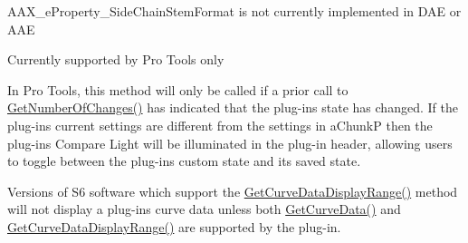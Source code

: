 \begin{DoxyRefList}
\label{a00879__compatibility_notes000064}%
%
 AAX\+\_\+e\+Property\+\_\+\+Side\+Chain\+Stem\+Format is not currently implemented in DAE or AAE  
\item[Member \mbox{\hyperlink{a00737_a13e384f22825afd3db6d68395b79ce0daf48412738dcfcc56046718d9e5a034d7}{AAX\+\_\+e\+Property\+\_\+\+Uses\+Client\+GUI}} ]\label{a00879__compatibility_notes000067}%
%
 Currently supported by Pro Tools only 
\item[Member \mbox{\hyperlink{a02068_a1e86f849e970c9998313fc7d451ccf85}{AAX\+\_\+\+IACFEffect\+Parameters\+::Compare\+Active\+Chunk}} (const \mbox{\hyperlink{a01784}{AAX\+\_\+\+SPlug\+In\+Chunk}} $\ast$i\+ChunkP, AAX\+\_\+\+CBoolean $\ast$o\+Is\+Equal) const =0]\label{a00879__compatibility_notes000049}%
%
 In Pro Tools, this method will only be called if a prior call to \mbox{\hyperlink{a00892_ga17b96da201d9a242d3662e87525a7227}{Get\+Number\+Of\+Changes()}} has indicated that the plug-\/in\textquotesingle{}s state has changed. If the plug-\/in\textquotesingle{}s current settings are different from the settings in {\ttfamily a\+ChunkP} then the plug-\/in\textquotesingle{}s Compare Light will be illuminated in the plug-\/in header, allowing users to toggle between the plug-\/in\textquotesingle{}s custom state and its saved state. 
\item[Member \mbox{\hyperlink{a00901_gaa85bda4027342eb644a9c92a17da6d49}{AAX\+\_\+\+IACFEffect\+Parameters\+::Get\+Curve\+Data}} (AAX\+\_\+\+CType\+ID i\+Curve\+Type, const float $\ast$i\+Values, uint32\+\_\+t i\+Num\+Values, float $\ast$o\+Values) const =0]\label{a00879__compatibility_notes000050}%
%
 Versions of S6 software which support the \mbox{\hyperlink{a00901_ga38d1ac0c15a7052904077ef0e2527e0d}{Get\+Curve\+Data\+Display\+Range()}} method will not display a plug-\/in\textquotesingle{}s curve data unless both \mbox{\hyperlink{a00901_gaa85bda4027342eb644a9c92a17da6d49}{Get\+Curve\+Data()}} and \mbox{\hyperlink{a00901_ga38d1ac0c15a7052904077ef0e2527e0d}{Get\+Curve\+Data\+Display\+Range()}} are supported by the plug-\/in. 
\item[Member \mbox{\hyperlink{a02068_a5d556ae1fa4617a6439ef347139d70eb}{AAX\+\_\+\+IACFEffect\+Parameters\+::Get\+Parameter\+Name\+Of\+Length}} (AAX\+\_\+\+CParam\+ID i\+Parameter\+ID, \mbox{\hyperlink{a02332}{AAX\+\_\+\+IString}} $\ast$o\+Name, int32\+\_\+t i\+Name\+Length) const =0]\label{a00879__compatibility_notes000048}%

\end{DoxyRefList}
